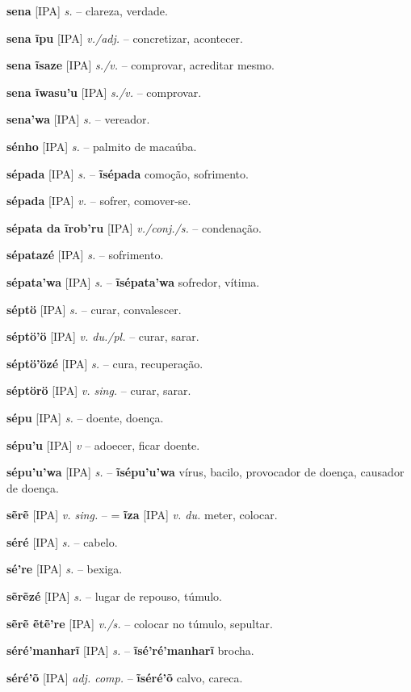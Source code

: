 \textbf{sena} [IPA] \textit{s.} -- clareza, verdade.

\textbf{sena ĩpu} [IPA] \textit{v./adj.} -- concretizar, acontecer.

\textbf{sena ĩsaze} [IPA] \textit{s./v.} -- comprovar, acreditar mesmo.

\textbf{sena ĩwasu'u} [IPA] \textit{s./v.} -- comprovar.

\textbf{sena'wa} [IPA] \textit{s.} -- vereador.

\textbf{sénho} [IPA] \textit{s.} -- palmito de macaúba.

\textbf{sépada} [IPA] \textit{s.} -- \textbf{ĩsépada} comoção, sofrimento.

\textbf{sépada} [IPA] \textit{v.} -- sofrer, comover-se.

\textbf{sépata da ĩrob'ru} [IPA] \textit{v./conj./s.} -- condenação.

\textbf{sépatazé} [IPA] \textit{s.} -- sofrimento.

\textbf{sépata'wa} [IPA] \textit{s.} -- \textbf{ĩsépata'wa} sofredor, vítima.

\textbf{séptö} [IPA] \textit{s.} -- curar, convalescer.

\textbf{séptö'ö} [IPA] \textit{v. du./pl.} -- curar, sarar.

\textbf{séptö'özé} [IPA] \textit{s.} -- cura, recuperação.

\textbf{séptörö} [IPA] \textit{v. sing.} -- curar, sarar.

\textbf{sépu} [IPA] \textit{s.} -- doente, doença.

\textbf{sépu'u} [IPA] \textit{v} -- adoecer, ficar doente.

\textbf{sépu'u'wa} [IPA] \textit{s.} -- \textbf{ĩsépu'u'wa} vírus, bacilo, provocador de doença, causador de doença.

\textbf{sẽrẽ} [IPA] \textit{v. sing.} -- = \textbf{ĩza} [IPA] \textit{v. du.} meter, colocar.

\textbf{séré} [IPA] \textit{s.} -- cabelo.

\textbf{sé're} [IPA] \textit{s.} -- bexiga.

\textbf{sẽrẽzé} [IPA] \textit{s.} -- lugar de repouso, túmulo.

\textbf{sẽrẽ ẽtẽ're} [IPA] \textit{v./s.} -- colocar no túmulo, sepultar.

\textbf{séré'manharĩ} [IPA] \textit{s.} -- \textbf{ĩsé'ré'manharĩ} brocha.

\textbf{séré'õ} [IPA] \textit{adj. comp.} -- \textbf{ĩséré'õ} calvo, careca.

